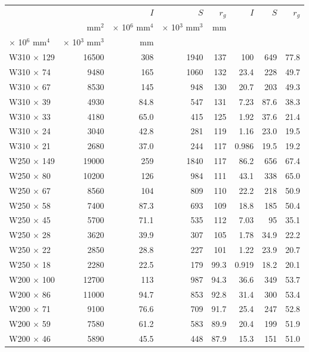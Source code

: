 \documentclass[a4paper,openany,12pt]{book}
\begin{document}
{{\begin{center}
\begin{tabular}{lrrrrrrr}
\toprule
 &  & \(I\) & \(S\) & \(r_g\) & \(I\) & \(S\) & \(r_g\)\\
 & mm\(^2\) & \(\times\) 10\(^6\) mm\(^4\) & \(\times\) 10\(^3\) mm\(^3\) & mm &  &  & \\
\(\times\) 10\(^6\) mm\(^4\) & \(\times\) 10\(^3\) mm\(^3\) & mm &  &  &  &  & \\
\midrule
W310 \(\times\) 129 & 16500 & 308 & 1940 & 137 & 100 & 649 & 77.8\\
W310 \(\times\) 74 & 9480 & 165 & 1060 & 132 & 23.4 & 228 & 49.7\\
W310 \(\times\) 67 & 8530 & 145 & 948 & 130 & 20.7 & 203 & 49.3\\
W310 \(\times\) 39 & 4930 & 84.8 & 547 & 131 & 7.23 & 87.6 & 38.3\\
W310 \(\times\) 33 & 4180 & 65.0 & 415 & 125 & 1.92 & 37.6 & 21.4\\
W310 \(\times\) 24 & 3040 & 42.8 & 281 & 119 & 1.16 & 23.0 & 19.5\\
W310 \(\times\) 21 & 2680 & 37.0 & 244 & 117 & 0.986 & 19.5 & 19.2\\
W250 \(\times\) 149 & 19000 & 259 & 1840 & 117 & 86.2 & 656 & 67.4\\
W250 \(\times\) 80 & 10200 & 126 & 984 & 111 & 43.1 & 338 & 65.0\\
W250 \(\times\) 67 & 8560 & 104 & 809 & 110 & 22.2 & 218 & 50.9\\
W250 \(\times\) 58 & 7400 & 87.3 & 693 & 109 & 18.8 & 185 & 50.4\\
W250 \(\times\) 45 & 5700 & 71.1 & 535 & 112 & 7.03 & 95 & 35.1\\
W250 \(\times\) 28 & 3620 & 39.9 & 307 & 105 & 1.78 & 34.9 & 22.2\\
W250 \(\times\) 22 & 2850 & 28.8 & 227 & 101 & 1.22 & 23.9 & 20.7\\
W250 \(\times\) 18 & 2280 & 22.5 & 179 & 99.3 & 0.919 & 18.2 & 20.1\\
W200 \(\times\) 100 & 12700 & 113 & 987 & 94.3 & 36.6 & 349 & 53.7\\
W200 \(\times\) 86 & 11000 & 94.7 & 853 & 92.8 & 31.4 & 300 & 53.4\\
W200 \(\times\) 71 & 9100 & 76.6 & 709 & 91.7 & 25.4 & 247 & 52.8\\
W200 \(\times\) 59 & 7580 & 61.2 & 583 & 89.9 & 20.4 & 199 & 51.9\\
W200 \(\times\) 46 & 5890 & 45.5 & 448 & 87.9 & 15.3 & 151 & 51.0\\

\end{tabular}
\end{center}}}
\end{document}
